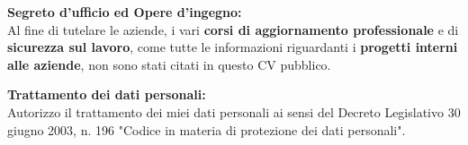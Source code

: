 
\par{
    \textbf{Segreto d'ufficio ed Opere d'ingegno:}\\
    Al fine di tutelare le aziende, i vari \textbf{corsi di aggiornamento professionale} e di \textbf{sicurezza sul lavoro}, come tutte le informazioni riguardanti i \textbf{progetti interni alle aziende}, non sono stati citati in questo CV pubblico.
}

\par{
    \textbf{Trattamento dei dati personali:}\\
    Autorizzo il trattamento dei miei dati personali ai sensi del Decreto Legislativo 30 giugno 2003, n. 196 "Codice in materia di protezione dei dati personali".
}
